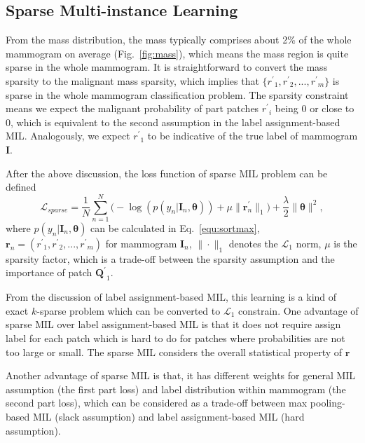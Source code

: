 \documentclass[runningheads,a4paper]{llncs}
\begin{document}
\subsection{Sparse Multi-instance Learning}\label{sec:sparse}
From the mass distribution, the mass typically comprises about 2\% of the whole mammogram on average (Fig.~\ref{fig:mass}), which means the mass region is quite sparse in the whole mammogram. It is straightforward to convert the mass sparsity to the malignant mass sparsity, which implies that $\{{r^\prime}_1, {r^\prime}_2, ..., {r^\prime}_m\}$ is sparse in the whole mammogram classification problem. The sparsity constraint means we expect the malignant probability of part patches ${r^ \prime}_i$ being 0 or close to 0, which is equivalent to the second assumption in the label assignment-based MIL. Analogously, we expect ${r^\prime}_1$ to be indicative of the true label of mammogram $\bm{I}$.

After the above discussion, the loss function of sparse MIL problem can be defined
\begin{equation}
\label{equ:weightedsparseloss}
\mathcal{L}_{sparse} = \frac{1}{N}\sum_{n=1}^{N} \big ( -\log(p(y_n | \bm{I}_n, \bm{\theta})) + \mu \|\bm{r}^{\prime}_n\|_1 \big ) +\frac{\lambda}{2} \|\bm{\theta}\|^2,
\end{equation}
where $p(y_n | \bm{I}_n, \bm{\theta})$ can be calculated in Eq.~\ref{equ:sortmax}, $\bm{r}_n = ({r^\prime}_1, {r^\prime}_2, ..., {r^\prime}_m)$ for mammogram $\bm{I}_n$, $\|\cdot\|_1$ denotes the $\mathcal{L}_1$ norm, $\mu$ is the sparsity factor, which is a trade-off between the sparsity assumption and the importance of patch ${\bm{Q}^\prime}_1$.

From the discussion of label assignment-based MIL, this learning is a kind of exact $k$-sparse problem which can be converted to $\mathcal{L}_1$ constrain. One advantage of sparse MIL over label assignment-based MIL is that it does not require assign label for each patch which is hard to do for patches where probabilities are not too large or small. The sparse MIL considers the overall statistical property of $\bm{r}$%

Another advantage of sparse MIL is that, it has different weights for general MIL assumption (the first part loss) and label distribution within mammogram (the second part loss), which can be considered as a trade-off between max pooling-based MIL (slack assumption) and label assignment-based MIL (hard assumption).
\end{document}
